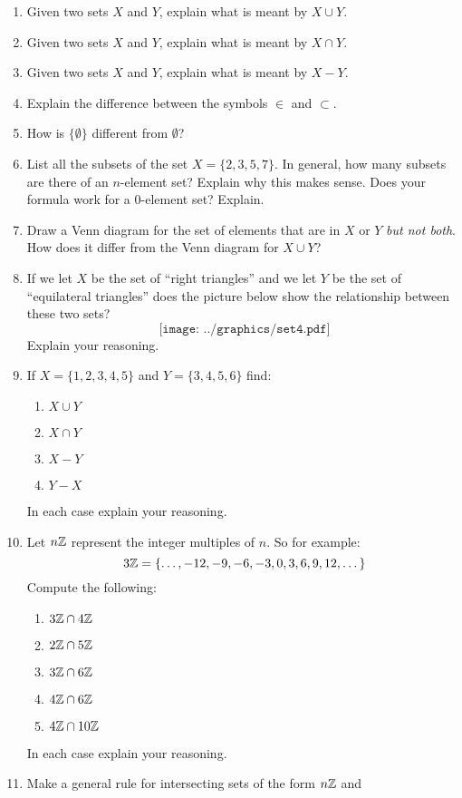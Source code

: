 \begin{problems}
\begin{enumerate}
\item Given two sets $X$ and $Y$, explain what is meant by $X\cup Y$.
\item Given two sets $X$ and $Y$, explain what is meant by $X\cap Y$.
\item Given two sets $X$ and $Y$, explain what is meant by $X - Y$.
\item Explain the difference between the symbols $\in$ and $\subset$.
\item How is $\{\emptyset\}$ different from $\emptyset$?  
\item List all the subsets of the set $X=\{2, 3, 5, 7\}$.  In general, how many 
subsets are there of an $n$-element set?  Explain why this makes sense.   
Does your formula work for a $0$-element set?  Explain.
\item Draw a Venn diagram for the set of elements that are in $X$ or $Y$ \emph{but not both}. 
How does it differ from the Venn diagram for $X\cup Y$?  
\item If we let $X$ be the set of ``right triangles'' and we let $Y$ be the set of ``equilateral triangles'' does the picture below show the relationship between these two sets?
\[
\texttt{[image: ../graphics/set4.pdf]}
\]
Explain your reasoning.
\item If $X = \{1,2,3,4,5\}$ and $Y = \{3,4,5,6\}$ find:
\begin{enumerate}
\item $X\cup Y$
\item $X\cap Y$
\item $X-Y$
\item $Y-X$
\end{enumerate}
In each case explain your reasoning. 
\item Let $n\mathbb Z$ represent the integer multiples of $n$. So for example:
\[
3\mathbb Z = \{\dots,-12,-9,-6,-3,0,3,6,9,12,\dots\}
\]
Compute the following:
\begin{enumerate}
\item $3\mathbb Z\cap 4\mathbb Z$
\item $2\mathbb Z\cap 5\mathbb Z$
\item $3\mathbb Z\cap 6\mathbb Z$
\item $4\mathbb Z\cap 6\mathbb Z$
\item $4\mathbb Z\cap 10\mathbb Z$
\end{enumerate}
In each case explain your reasoning. 
\item Make a general rule for intersecting sets of the form $n\mathbb Z$ and

\end{enumerate}
\end{problems}
